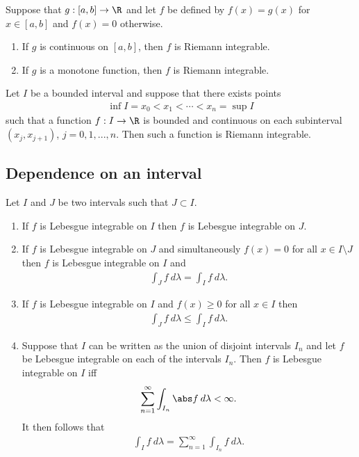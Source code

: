 \documentclass{article}
\begin{document}
\begin{theorem}[Notes 4.7]
	Suppose that $g:[a,b]\to\R$ and let $f$ be defined by $f(x)=g(x)$ for $x\in[a,b]$ and $f(x)=0$
	otherwise.
	\begin{enumerate}
		\item If $g$ is continuous on $[a,b]$, then $f$ is Riemann integrable.
		\item If $g$ is a monotone function, then $f$ is Riemann integrable.
	\end{enumerate}
\end{theorem}

\begin{corollary*}
	Let $I$ be a bounded interval and suppose that there exists points
	\begin{align*}
		\inf I=x_0<x_1<\cdots<x_n=\sup I
	\end{align*}
	such that a function $f:I\to\R$ is bounded and continuous on each subinterval $(x_j,x_{j+1})$,
	$j=0,1,...,n$. Then such a function is Riemann integrable.
\end{corollary*}

\subsection{Dependence on an interval}

\begin{theorem}[Notes 4.8]
	Let $I$ and $J$ be two intervals such that $J\subset I$.
	\begin{enumerate}
		\item If $f$ is Lebesgue integrable on $I$ then $f$ is Lebesgue integrable on $J$.
		\item If $f$ is Lebesgue integrable on $J$ and simultaneously $f(x)=0$ for all $x\in I\setminus J$
		      then $f$ is Lebesgue integrable on $I$ and \begin{align*}
			      \int_J f\:d\lambda = \int_I f\:d\lambda.
		      \end{align*}
		\item If $f$ is Lebesgue integrable on $I$ and $f(x)\geq 0$ for all $x\in I$ then \begin{align*}
			      \int_J f\:d\lambda \leq \int_I f\:d\lambda.
		      \end{align*}
		\item Suppose that $I$ can be written as the union of disjoint intervals $I_n$ and let $f$
		      be Lebesgue integrable on each of the intervals $I_n$. Then $f$ is Lebesgue integrable on $I$ iff
		      \begin{align*}
			      \sum_{n=1}^\infty \int_{I_n} \abs f\:d\lambda < \infty.
		      \end{align*}
		      It then follows that \begin{align*}
			      \int_I f\:d\lambda = \sum_{n=1}^\infty \int_{I_n}f\:d\lambda.
		      \end{align*}
	\end{enumerate}
\end{theorem}
\end{document}
